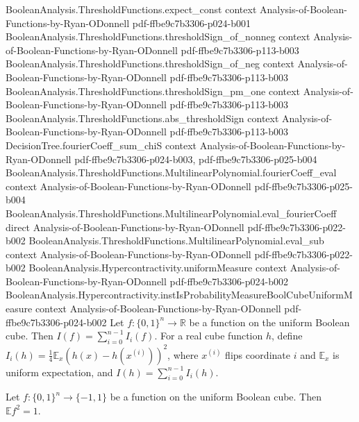 \begin{lemma}
\proofstep
  {BooleanAnalysis.ThresholdFunctions.expect_const}
  {context}
  {Analysis-of-Boolean-Functions-by-Ryan-ODonnell}
  {pdf-ffbe9c7b3306-p024-b001}
\proofstep
  {BooleanAnalysis.ThresholdFunctions.thresholdSign_of_nonneg}
  {context}
  {Analysis-of-Boolean-Functions-by-Ryan-ODonnell}
  {pdf-ffbe9c7b3306-p113-b003}
\proofstep
  {BooleanAnalysis.ThresholdFunctions.thresholdSign_of_neg}
  {context}
  {Analysis-of-Boolean-Functions-by-Ryan-ODonnell}
  {pdf-ffbe9c7b3306-p113-b003}
\proofstep
  {BooleanAnalysis.ThresholdFunctions.thresholdSign_pm_one}
  {context}
  {Analysis-of-Boolean-Functions-by-Ryan-ODonnell}
  {pdf-ffbe9c7b3306-p113-b003}
\proofstep
  {BooleanAnalysis.ThresholdFunctions.abs_thresholdSign}
  {context}
  {Analysis-of-Boolean-Functions-by-Ryan-ODonnell}
  {pdf-ffbe9c7b3306-p113-b003}
\proofstep
  {DecisionTree.fourierCoeff_sum_chiS}
  {context}
  {Analysis-of-Boolean-Functions-by-Ryan-ODonnell}
  {pdf-ffbe9c7b3306-p024-b003,
    pdf-ffbe9c7b3306-p025-b004}
\proofstep
  {BooleanAnalysis.ThresholdFunctions.MultilinearPolynomial.fourierCoeff_eval}
  {context}
  {Analysis-of-Boolean-Functions-by-Ryan-ODonnell}
  {pdf-ffbe9c7b3306-p025-b004}
\proofstep
  {BooleanAnalysis.ThresholdFunctions.MultilinearPolynomial.eval_fourierCoeff}
  {direct}
  {Analysis-of-Boolean-Functions-by-Ryan-ODonnell}
  {pdf-ffbe9c7b3306-p022-b002}
\proofstep
  {BooleanAnalysis.ThresholdFunctions.MultilinearPolynomial.eval_sub}
  {context}
  {Analysis-of-Boolean-Functions-by-Ryan-ODonnell}
  {pdf-ffbe9c7b3306-p022-b002}
\proofstep
  {BooleanAnalysis.Hypercontractivity.uniformMeasure}
  {context}
  {Analysis-of-Boolean-Functions-by-Ryan-ODonnell}
  {pdf-ffbe9c7b3306-p024-b002}
\proofstep
  {BooleanAnalysis.Hypercontractivity.instIsProbabilityMeasureBoolCubeUniformMeasure}
  {context}
  {Analysis-of-Boolean-Functions-by-Ryan-ODonnell}
  {pdf-ffbe9c7b3306-p024-b002}
\label{KKL.totalInfluence_eq_sum_influences}
Let $f:\{0,1\}^n\to\mathbb R$ be a function on the uniform Boolean cube. Then
$I(f)=\sum_{i=0}^{n-1}I_i(f)$. For a real cube function $h$, define
$I_i(h)=\tfrac14\mathbb E_x(h(x)-h(x^{(i)}))^2$, where $x^{(i)}$ flips coordinate $i$
and $\mathbb E_x$ is uniform expectation, and $I(h)=\sum_{i=0}^{n-1}I_i(h)$.
\end{lemma}

\begin{lemma}
\leanok
{}
\label{KKL.expect_sq_pm_one}
Let $f:\{0,1\}^n\to\{-1,1\}$ be a function on the uniform Boolean cube. Then $\mathbb
Ef^2=1$.
\end{lemma}

